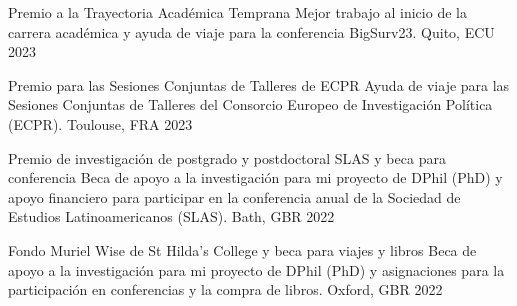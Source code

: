 





\vspace{1mm}

\begin{cvhonors}
\cvhonor
{Premio a la Trayectoria Académica Temprana}
{Mejor trabajo al inicio de la carrera académica y ayuda de viaje para la conferencia BigSurv23.} %
{Quito, ECU}
{2023}
\end{cvhonors}

\vspace{1mm}

\begin{cvhonors}
\cvhonor
{Premio para las Sesiones Conjuntas de Talleres de ECPR} 
{Ayuda de viaje para las Sesiones Conjuntas de Talleres del Consorcio Europeo de Investigación Política (ECPR).} %
{Toulouse, FRA}
{2023}
\end{cvhonors}

\vspace{1mm}

\begin{cvhonors}
\cvhonor
{Premio de investigación de postgrado y postdoctoral SLAS y beca para conferencia} 
{Beca de apoyo a la investigación para mi proyecto de DPhil (PhD) y apoyo financiero para participar en la conferencia anual de la Sociedad de Estudios Latinoamericanos (SLAS).} %
{Bath, GBR}
{2022}
\end{cvhonors}

\vspace{1mm}

\begin{cvhonors}
\cvhonor
{Fondo Muriel Wise de St Hilda's College y beca para viajes y libros} 
{Beca de apoyo a la investigación para mi proyecto de DPhil (PhD) y asignaciones para la participación en conferencias y la compra de libros.} %
{Oxford, GBR}
{2022}
\end{cvhonors}

